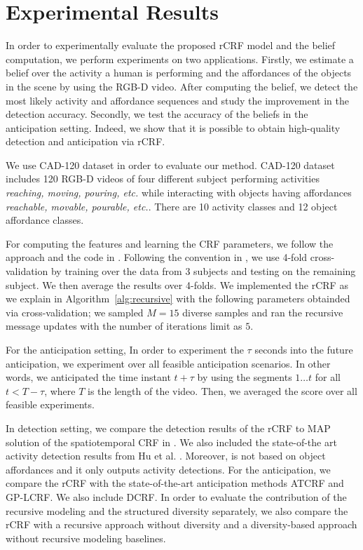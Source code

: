\section{Experimental Results}
In order to experimentally evaluate the proposed rCRF model and the belief computation, we perform experiments on two applications. Firstly, we estimate a belief over the activity a human is performing and the affordances of the objects in the scene by using the RGB-D video. After computing the belief, we detect the most likely activity and affordance sequences and study the improvement in the detection accuracy. Secondly, we test the accuracy of the beliefs in the anticipation setting. Indeed, we show that it is possible to obtain high-quality detection and anticipation via rCRF.



 We use CAD-120 \cite{hemaIJRR} dataset in order to evaluate our method. CAD-120 dataset includes 120 RGB-D videos of four different subject performing activities \emph{reaching, moving, pouring, etc.} while interacting with objects having affordances \emph{reachable, movable, pourable, etc.}. There are 10 activity classes and 12 object affordance classes.

 For computing the features and learning the CRF parameters, we follow the approach and the code in \cite{hemaIJRR}. Following the convention in \cite{hemaIJRR}, we use 4-fold cross-validation by training over the data from 3 subjects and testing on the remaining subject. We then average the results over 4-folds. We implemented the rCRF as we explain in Algorithm~\ref{alg:recursive} with the following parameters obtainded via cross-validation; we sampled $M=15$ diverse samples and ran the recursive message updates with the number of iterations limit as $5$.

For the anticipation setting, In order to experiment the $\tau$ seconds into the future anticipation, we experiment over all feasible anticipation scenarios. In other words, we anticipated the time instant $t+\tau$ by using the segments $1\ldots t$ for all $t<T-\tau$, where $T$ is the length of the video. Then, we averaged the score over all feasible experiments.

 In detection setting, we compare the detection results of the rCRF to MAP solution of the spatiotemporal CRF in \cite{hemaIJRR}. We also included the state-of-the art activity detection results from Hu et al. \cite{latentIcra}. Moreover, \cite{latentIcra} is not based on object affordances and it only outputs activity detections. For the anticipation, we compare the rCRF with the state-of-the-art anticipation methods ATCRF \cite{hemaAnt} and GP-LCRF\cite{gpcrf}. We also include DCRF\cite{ddcrf}. In order to evaluate the contribution of the recursive modeling and the structured diversity separately, we also compare the rCRF with a recursive approach without diversity and a diversity-based approach without recursive modeling baselines.

